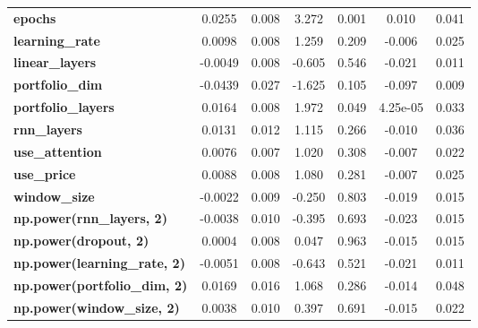 \begin{center}
\begin{tabular}{lcccccc}
\textbf{epochs}                            &       0.0255  &        0.008     &     3.272  &         0.001        &        0.010    &        0.041     \\
\textbf{learning\_rate}                    &       0.0098  &        0.008     &     1.259  &         0.209        &       -0.006    &        0.025     \\
\textbf{linear\_layers}                    &      -0.0049  &        0.008     &    -0.605  &         0.546        &       -0.021    &        0.011     \\
\textbf{portfolio\_dim}                    &      -0.0439  &        0.027     &    -1.625  &         0.105        &       -0.097    &        0.009     \\
\textbf{portfolio\_layers}                 &       0.0164  &        0.008     &     1.972  &         0.049        &     4.25e-05    &        0.033     \\
\textbf{rnn\_layers}                       &       0.0131  &        0.012     &     1.115  &         0.266        &       -0.010    &        0.036     \\
\textbf{use\_attention}                    &       0.0076  &        0.007     &     1.020  &         0.308        &       -0.007    &        0.022     \\
\textbf{use\_price}                        &       0.0088  &        0.008     &     1.080  &         0.281        &       -0.007    &        0.025     \\
\textbf{window\_size}                      &      -0.0022  &        0.009     &    -0.250  &         0.803        &       -0.019    &        0.015     \\
\textbf{np.power(rnn\_layers, 2)}          &      -0.0038  &        0.010     &    -0.395  &         0.693        &       -0.023    &        0.015     \\
\textbf{np.power(dropout, 2)}              &       0.0004  &        0.008     &     0.047  &         0.963        &       -0.015    &        0.015     \\
\textbf{np.power(learning\_rate, 2)}       &      -0.0051  &        0.008     &    -0.643  &         0.521        &       -0.021    &        0.011     \\
\textbf{np.power(portfolio\_dim, 2)}       &       0.0169  &        0.016     &     1.068  &         0.286        &       -0.014    &        0.048     \\
\textbf{np.power(window\_size, 2)}         &       0.0038  &        0.010     &     0.397  &         0.691        &       -0.015    &        0.022     \\

\end{tabular}
\end{center}
